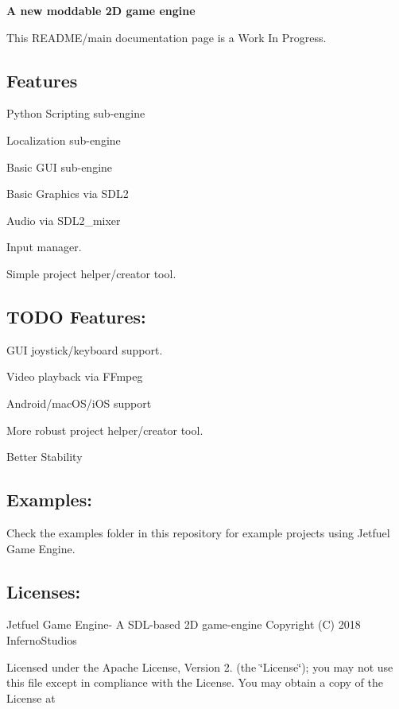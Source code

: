 {\bfseries A new moddable 2D game engine}

This R\+E\+A\+D\+M\+E/main documentation page is a Work In Progress.

\subsection*{Features}


\begin{DoxyItemize}
\item Python Scripting sub-\/engine
\item Localization sub-\/engine
\item Basic G\+UI sub-\/engine
\item Basic Graphics via S\+D\+L2
\item Audio via S\+D\+L2\+\_\+mixer
\item Input manager.
\item Simple project helper/creator tool.
\end{DoxyItemize}

\subsection*{T\+O\+DO Features\+:}


\begin{DoxyItemize}
\item G\+UI joystick/keyboard support.
\item Video playback via F\+Fmpeg
\item Android/mac\+O\+S/i\+OS support
\item More robust project helper/creator tool.
\item Better Stability
\end{DoxyItemize}

\subsection*{Examples\+:}

Check the examples folder in this repository for example projects using Jetfuel Game Engine.

\subsection*{Licenses\+:}

Jetfuel Game Engine-\/ A S\+D\+L-\/based 2D game-\/engine Copyright (C) 2018 Inferno\+Studios

Licensed under the Apache License, Version 2. (the \char`\"{}\+License\char`\"{}); you may not use this file except in compliance with the License. You may obtain a copy of the License at

